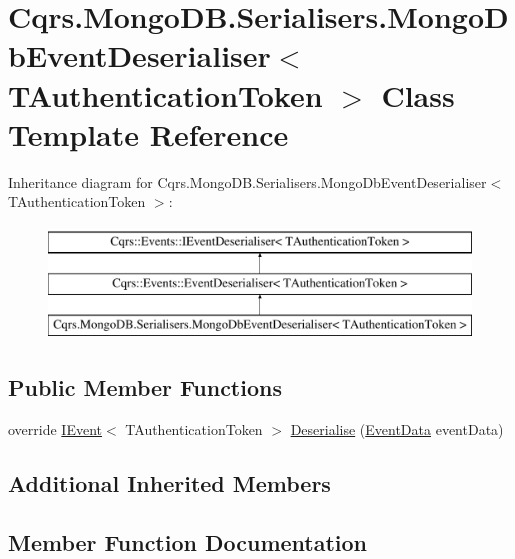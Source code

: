 \hypertarget{classCqrs_1_1MongoDB_1_1Serialisers_1_1MongoDbEventDeserialiser}{}\section{Cqrs.\+Mongo\+D\+B.\+Serialisers.\+Mongo\+Db\+Event\+Deserialiser$<$ T\+Authentication\+Token $>$ Class Template Reference}
\label{classCqrs_1_1MongoDB_1_1Serialisers_1_1MongoDbEventDeserialiser}
Inheritance diagram for Cqrs.\+Mongo\+D\+B.\+Serialisers.\+Mongo\+Db\+Event\+Deserialiser$<$ T\+Authentication\+Token $>$\+:\begin{figure}[H]
\begin{center}
\leavevmode
\includegraphics[height=3.000000cm]{classCqrs_1_1MongoDB_1_1Serialisers_1_1MongoDbEventDeserialiser}
\end{center}
\end{figure}
\subsection*{Public Member Functions}
\begin{DoxyCompactItemize}
\item 
override \hyperlink{interfaceCqrs_1_1Events_1_1IEvent}{I\+Event}$<$ T\+Authentication\+Token $>$ \hyperlink{classCqrs_1_1MongoDB_1_1Serialisers_1_1MongoDbEventDeserialiser_a2ea63367d97bf66e3dffcabb8c53005e_a2ea63367d97bf66e3dffcabb8c53005e}{Deserialise} (\hyperlink{classCqrs_1_1Events_1_1EventData}{Event\+Data} event\+Data)
\end{DoxyCompactItemize}
\subsection*{Additional Inherited Members}


\subsection{Member Function Documentation}
\mbox{\label{classCqrs_1_1MongoDB_1_1Serialisers_1_1MongoDbEventDeserialiser_a2ea63367d97bf66e3dffcabb8c53005e_a2ea63367d97bf66e3dffcabb8c53005e}} 
